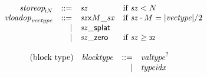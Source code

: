 $$
\begin{array}[t]{@{}lrrl@{}l@{}}
& {{\mathit{storeop}}}_{{\mathsf{i}}{N}} & ::= & {\mathit{sz}} & \quad \mbox{if}~ {\mathit{sz}} < N \\
& {{\mathit{vloadop}}}_{{\mathit{vectype}}} & ::= & {{\mathit{sz}}}{\mathsf{x}}{M}{\mathsf{\_}}{{\mathit{sx}}} & \quad \mbox{if}~ {\mathit{sz}} \cdot M = {|{\mathit{vectype}}|} / 2 \\
& & | & {{\mathit{sz}}}{\mathsf{\_}}{\mathsf{splat}} \\
& & | & {{\mathit{sz}}}{\mathsf{\_}}{\mathsf{zero}} & \quad \mbox{if}~ {\mathit{sz}} \geq \mathsf{{\scriptstyle 32}} \\
\end{array}
$$

\vspace{1ex}

$$
\begin{array}[t]{@{}lrrl@{}l@{}}
\mbox{(block type)} & {\mathit{blocktype}} & ::= & {{\mathit{valtype}}^?} \\
& & | & {\mathit{typeidx}} \\
\end{array}
$$

\vspace{1ex}

